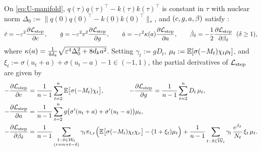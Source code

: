 \begin{lemma}
\label{lem:J-reduce}
\label{lem:U-reduce}
On \cref{eq:U-manifold}, $q(\tau)q(\tau)^\top - k(\tau)k(\tau)^\top$ is constant in $\tau$ with nuclear norm $\Delta_0 := \|q(0)q(0)^\top - k(0)k(0)^\top\|_*$, and $(c, g, a, \beta)$ satisfy \stepode{}:
\begin{equation}
 \dot\cnt = -\initscale^2\pd{\Lstep}{\cnt}, \qquad
 \dot g = -\initscale^2 v^2\pd{\Lstep}{g}, \qquad
 \dot a = -\initscale^2\kappa(a)\pd{\Lstep}{a}, \qquad
 \dot\brel_\delta = -\frac{1}{2}\pd{\Lstep}{\brel_\delta} \;\; (\delta \ge 1),
 \label{eq:J-flow}
\end{equation}
where $\kappa(a) = \frac{1}{4d_k}\sqrt{\varepsilon^4\Delta_0^2 + 8d_k a^2}$. Setting $\gamma_t := g D_t$, $\mu_t := \mathbb E[\sigma(-M_t)\chi_t\rho_t]$, and $\xi_t := \sigma(u_t+a)+\sigma(u_t-a)-1 \in (-1,1)$, the partial derivatives of $\mathcal L_{\mathrm{step}}$ are given by
\begin{subequations}
\label{eq:U-explicit-grads}
\begin{align}
 -\pd{\Lstep}{\cnt} &= \frac{1}{n-1}\sum_{t=2}^n \E\bigl[\sigma(-M_t)\chi_t\bigr], \qquad\qquad
 -\pd{\Lstep}{g} = \frac{1}{n-1}\sum_{t=2}^n D_t\,\mu_t,\\
 -\pd{\Lstep}{a} &= \frac{1}{n-1}\sum_{t=2}^n g\bigl(\sigma'(u_t+a)+\sigma'(u_t-a)\bigr)\mu_t,\\
 -\pd{\Lstep}{\brel_\delta} &= \frac{1}{n-1}\sum_{\substack{t\,:\,\delta\in\mathcal W_t\\(r = n+t-\delta)}} \gamma_t\pi_{t,r}\Bigl(\E\bigl[\sigma(-M_t)\chi_t\chi_r\bigr] - (1+\xi_t)\mu_t\Bigr) + \frac{1}{n-1}\sum_{t\,:\,\delta\in\overline{\mathcal W}_t} \gamma_t\,\frac{e^{\brel_\delta}}{N_t}\,\xi_t\,\mu_t.
 \label{eq:U-beta-explicit}
\end{align}
\end{subequations}
\end{lemma}
